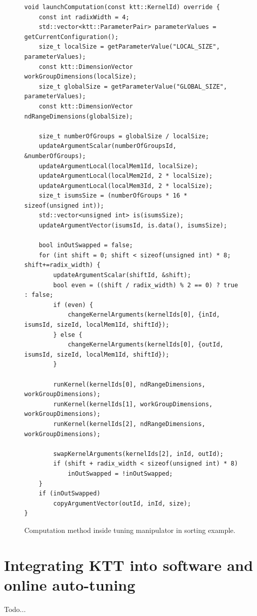 \documentclass
[
    digital, %
    oneside, %
    table, %
    nolof, %
    nolot, %
    nocover %
]{fithesis3}
\begin{document}
\begin{figure}
\footnotesize
\begin{adjustwidth}{-1cm}{-1cm}
\begin{lstlisting}
void launchComputation(const ktt::KernelId) override {
    const int radixWidth = 4;
    std::vector<ktt::ParameterPair> parameterValues = getCurrentConfiguration();
    size_t localSize = getParameterValue("LOCAL_SIZE", parameterValues);
    const ktt::DimensionVector workGroupDimensions(localSize);
    size_t globalSize = getParameterValue("GLOBAL_SIZE", parameterValues);
    const ktt::DimensionVector ndRangeDimensions(globalSize);
    
    size_t numberOfGroups = globalSize / localSize;
    updateArgumentScalar(numberOfGroupsId, &numberOfGroups);
    updateArgumentLocal(localMem1Id, localSize);
    updateArgumentLocal(localMem2Id, 2 * localSize);
    updateArgumentLocal(localMem3Id, 2 * localSize);
    size_t isumsSize = (numberOfGroups * 16 * sizeof(unsigned int));
    std::vector<unsigned int> is(isumsSize);
    updateArgumentVector(isumsId, is.data(), isumsSize);
    
    bool inOutSwapped = false;
    for (int shift = 0; shift < sizeof(unsigned int) * 8; shift+=radix_width) {
        updateArgumentScalar(shiftId, &shift);
        bool even = ((shift / radix_width) % 2 == 0) ? true : false;
        if (even) {
            changeKernelArguments(kernelIds[0], {inId, isumsId, sizeId, localMem1Id, shiftId});
        } else {
            changeKernelArguments(kernelIds[0], {outId, isumsId, sizeId, localMem1Id, shiftId});
        }
        
        runKernel(kernelIds[0], ndRangeDimensions, workGroupDimensions);
        runKernel(kernelIds[1], workGroupDimensions, workGroupDimensions);
        runKernel(kernelIds[2], ndRangeDimensions, workGroupDimensions);
        
        swapKernelArguments(kernelIds[2], inId, outId);
        if (shift + radix_width < sizeof(unsigned int) * 8)
            inOutSwapped = !inOutSwapped;
    }
    if (inOutSwapped)
        copyArgumentVector(outId, inId, size);
}
\end{lstlisting}
\caption{Computation method inside tuning manipulator in sorting example.}
\label{sort-example-manipulator}
\end{adjustwidth}
\end{figure}

\section{Integrating KTT into software and online auto-tuning}
Todo...
\end{document}
